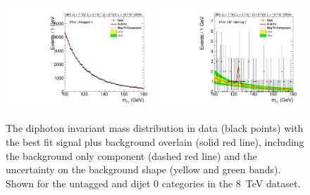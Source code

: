 \begin{figure}
  \includegraphics[width=0.49\textwidth]{results/plots/mgg-cats/mgg_mva_nosub_ch2_cat4_8TeV.pdf}
  \includegraphics[width=0.49\textwidth]{results/plots/mgg-cats/mgg_mva_nosub_ch2_cat5_8TeV.pdf}
  \caption[The diphoton invariant mass distribution in data with the best fit signal plus background overlain for the untagged and dijet 0 categories in the 8~TeV dataset.]{The diphoton invariant mass distribution in data (black points) with the best fit signal plus background overlain (solid red line), including the background only component (dashed red line) and the uncertainty on the background shape (yellow and green bands). Shown for the untagged and dijet 0 categories in the 8~TeV dataset.}
  \label{fig:bfres3}
\end{figure}

